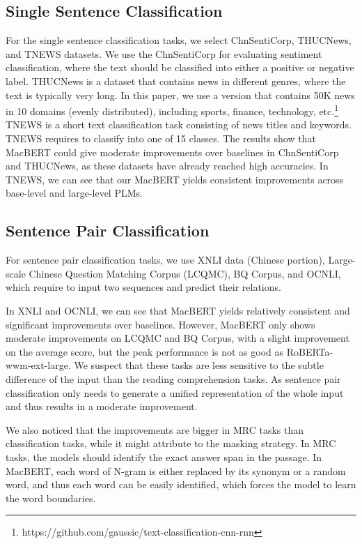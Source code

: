 \documentclass[journal]{IEEEtran}
\begin{document}
\begin{CJK*}{UTF8}{gbsn}
\subsection{Single Sentence Classification}
For the single sentence classification tasks, we select ChnSentiCorp, THUCNews, and TNEWS datasets.
We use the ChnSentiCorp for evaluating sentiment classification, where the text should be classified into either a positive or negative label.
THUCNews is a dataset that contains news in different genres, where the text is typically very long.
In this paper, we use a version that contains 50K news in 10 domains (evenly distributed), including sports, finance, technology, etc.\footnote{https://github.com/gaussic/text-classification-cnn-rnn}
TNEWS is a short text classification task consisting of news titles and keywords. TNEWS requires to classify into one of 15 classes. 
The results show that MacBERT could give moderate improvements over baselines in ChnSentiCorp and THUCNews, as these datasets have already reached high accuracies.
In TNEWS, we can see that our MacBERT yields consistent improvements across base-level and large-level PLMs.



\subsection{Sentence Pair Classification}
For sentence pair classification tasks, we use XNLI data (Chinese portion), Large-scale Chinese Question Matching Corpus (LCQMC), BQ Corpus, and OCNLI, which require to input two sequences and predict their relations.

In XNLI and OCNLI, we can see that MacBERT yields relatively consistent and significant improvements over baselines.
However, MacBERT only shows moderate improvements on LCQMC and BQ Corpus, with a slight improvement on the average score, but the peak performance is not as good as RoBERTa-wwm-ext-large. 
We suspect that these tasks are less sensitive to the subtle difference of the input than the reading comprehension tasks. 
As sentence pair classification only needs to generate a unified representation of the whole input and thus results in a moderate improvement.

We also noticed that the improvements are bigger in MRC tasks than classification tasks, while it might attribute to the masking strategy.
In MRC tasks, the models should identify the exact answer span in the passage. 
In MacBERT, each word of N-gram is either replaced by its synonym or a random word, and thus each word can be easily identified, which forces the model to learn the word boundaries. 


\end{CJK*}
\end{document}
